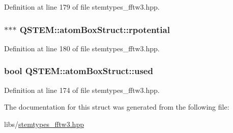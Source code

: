 Definition at line 179 of file stemtypes\-\_\-fftw3.\-hpp.

\hypertarget{struct_q_s_t_e_m_1_1atom_box_struct_a1a5104f1a57b81c4e5f4c26df3f271b3}{
\subsubsection[{rpotential}]{$\ast$$\ast$$\ast$ Q\-S\-T\-E\-M\-::atom\-Box\-Struct\-::rpotential}}\label{struct_q_s_t_e_m_1_1atom_box_struct_a1a5104f1a57b81c4e5f4c26df3f271b3}


Definition at line 180 of file stemtypes\-\_\-fftw3.\-hpp.

\hypertarget{struct_q_s_t_e_m_1_1atom_box_struct_ae6ee2f85a1cb977d392cbbdb5fabcdf4}{
\subsubsection[{used}]{\setlength{\rightskip}{0pt plus 5cm}bool Q\-S\-T\-E\-M\-::atom\-Box\-Struct\-::used}}\label{struct_q_s_t_e_m_1_1atom_box_struct_ae6ee2f85a1cb977d392cbbdb5fabcdf4}


Definition at line 174 of file stemtypes\-\_\-fftw3.\-hpp.



The documentation for this struct was generated from the following file\-:\begin{DoxyCompactItemize}
\item 
libs/\hyperlink{stemtypes__fftw3_8hpp}{stemtypes\-\_\-fftw3.\-hpp}\end{DoxyCompactItemize}
